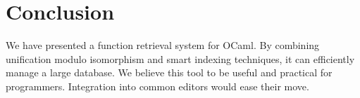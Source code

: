 \documentclass [a4paper,11pt] {scrartcl}
\begin{document}

\section {Conclusion}

We have presented a function retrieval system for OCaml. By combining unification modulo isomorphism and smart indexing techniques, it can efficiently manage a large database. We believe this tool to be useful and practical for programmers. Integration into common editors would ease their move.


\printbibliography
\end{document}
